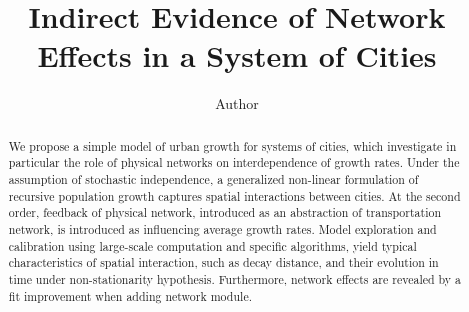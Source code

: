 \documentclass[Royal,sageh,times]{sagej}
\begin{document}

\title{Indirect Evidence of Network Effects in a System of Cities}

\author{Author}




\email{}



\begin{abstract}
We propose a simple model of urban growth for systems of cities, which investigate in particular the role of physical networks on interdependence of growth rates. Under the assumption of stochastic independence, a generalized non-linear formulation of recursive population growth captures spatial interactions between cities. At the second order, feedback of physical network, introduced as an abstraction of transportation network, is introduced as influencing average growth rates. Model exploration and calibration using large-scale computation and specific algorithms, yield typical characteristics of spatial interaction, such as decay distance, and their evolution in time under non-stationarity hypothesis. Furthermore, network effects are revealed by a fit improvement when adding network module.
\end{abstract}


\maketitle





%
%
%
%
\end{document}

